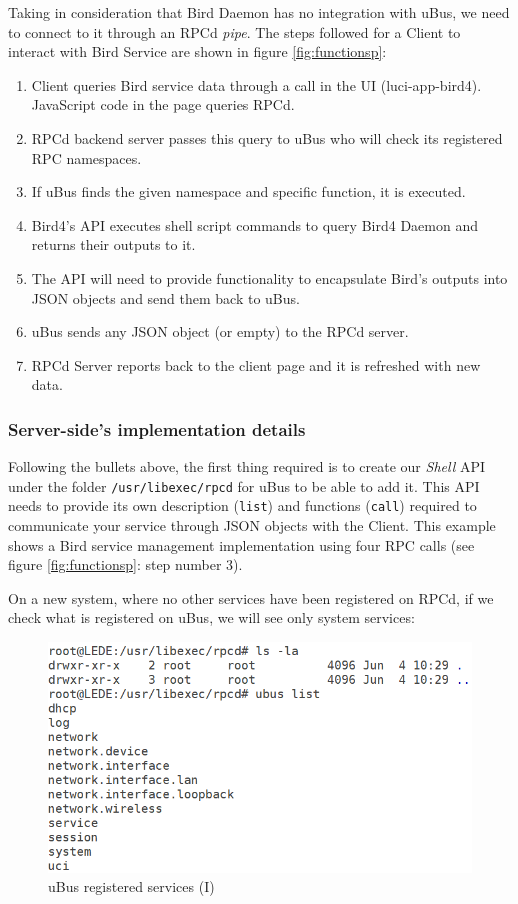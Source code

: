 Taking in consideration that Bird Daemon has no integration with uBus, we need to connect to it through an RPCd \textit{pipe}. The steps followed for a Client to interact with Bird Service are shown in figure \ref{fig:functionsp}:
\begin{enumerate}
    \item Client queries Bird service data through a call in the UI (luci-app-bird4). JavaScript code in the page queries RPCd.
    \item RPCd backend server passes this query to uBus who will check its registered RPC namespaces.
    \item If uBus finds the given namespace and specific function, it is executed.
    \item Bird4's API executes shell script commands to query Bird4 Daemon and returns their outputs to it.
    \item The API will need to provide functionality to encapsulate Bird's outputs into JSON objects and send them back to uBus.
    \item uBus sends any JSON object (or empty) to the RPCd server.
    \item RPCd Server reports back to the client page and it is refreshed with new data.
\end{enumerate}

\subsubsection{Server-side's implementation details}
Following the bullets above, the first thing required is to create our \textit{Shell} API under the folder \texttt{/usr/libexec/rpcd} for uBus to be able to add it. This API needs to provide its own description (\texttt{list}) and functions (\texttt{call}) required to communicate your service through JSON objects with the Client. This example shows a Bird service management implementation using four RPC calls (see figure \ref{fig:functionsp}: step number 3).



On a new system, where no other services have been registered on RPCd, if we check what is registered on uBus, we will see only system services:

\begin{figure}[H]
    \centering
    \includegraphics[width=\textwidth]{images/luci2/step1}
    \caption{uBus registered services (I)}
    \label{fig:ubusrs1}
\end{figure}

